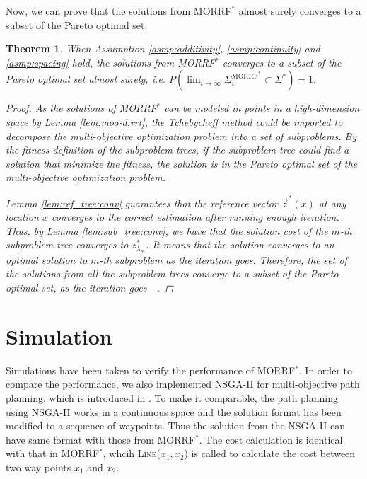 \documentclass[conference]{IEEEtran}
\newtheorem{thm}{Theorem}
\begin{document}
Now, we can prove that the solutions from MORRF$^{*}$ almost surely converges to a subset of the Pareto optimal set.

\begin{thm}
\label{thm:morrt:conv}
When Assumption \ref{asmp:additivity}, \ref{asmp:continuity} and \ref{asmp:spacing} hold,
the solutions from MORRF$^{*} $ converges to a subset of the Pareto optimal set almost surely, i.e.
$
P( \lim_{ i \rightarrow \infty }  \Sigma^{\mbox{MORRF}^{*}}_{i}  \subset \Sigma^{*} ) = 1.
$
\begin{proof}
As the solutions of MORRF$^{*}$ can be modeled in points in a high-dimension space by Lemma \ref{lem:moo-d:rrt}, the Tchebycheff method could be imported to decompose the multi-objective optimization problem into a set of subproblems.
By the fitness definition of the subproblem trees, if the subproblem tree could find a solution that minimize the fitness, the solution is in the Pareto optimal set of the multi-objective optimization problem.

Lemma \ref{lem:ref_tree:conv} guarantees that the reference vector $ \vec{z}^{*}(x) $ at any location $ x $ converges to the correct estimation after running enough iteration.
Thus, by Lemma \ref{lem:sub_tree:conv}, we have that the solution cost of the $ m $-th subproblem tree converges to $ z^{*}_{ \lambda_{m} } $.
It means that the solution converges to an optimal solution to $ m $-th subproblem as the iteration goes.
Therefore, the set of the solutions from all the subproblem trees converge to a subset of the Pareto optimal set, as the iteration goes~\cite{4358754}~\cite{miettinen1999nonlinear}.
\end{proof}
\end{thm}

\section{Simulation}
\label{sec:simulation}

Simulations have been taken to verify the performance of MORRF$^{*}$.
In order to compare the performance, we also implemented NSGA-II for multi-objective path planning, which is introduced in \cite{Ahmed2013}.
To make it comparable, the path planning using NSGA-II works in a continuous space and the solution format has been modified to a sequence of waypoints.
Thus the solution from the NSGA-II can have same format with those from MORRF$^{*}$.
The cost calculation is identical with that in  MORRF$^{*}$, whcih \textsc{Line}($ x_{1}, x_{2} $) is called to calculate the cost between two way points $ x_{1} $ and $ x_{2} $.
\end{document}
